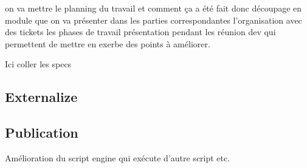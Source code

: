on va mettre le planning du travail et comment ça a été fait
donc découpage en module que on va présenter dans les parties correspondantes
l'organisation avec des tickets
les phases de travail
présentation pendant les réunion dev qui permettent de mettre en exerbe des
points à améliorer.




Ici coller les specs



\subsection{Externalize}




\subsection{Publication}

Amélioration du script engine qui exécute d'autre script etc.

